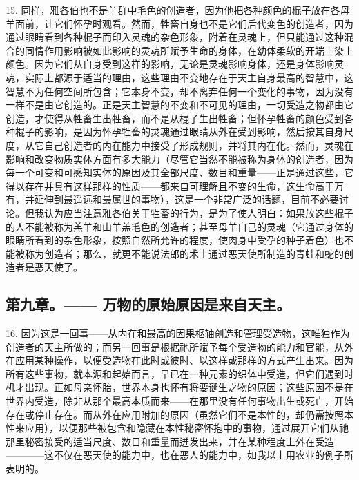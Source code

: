 15. 同样，雅各伯也不是羊群中毛色的创造者，因为他把各种颜色的棍子放在各母羊面前，让它们怀孕时观看。然而，牲畜自身也不是它们后代变色的创造者，因为通过眼睛看到各种棍子而印入灵魂的杂色形象，附着在灵魂上，但只能通过这种混合的同情作用影响被如此影响的灵魂所赋予生命的身体，在幼体柔软的开端上染上颜色。因为它们从自身受到这样的影响，无论是灵魂影响身体，还是身体影响灵魂，实际上都源于适当的理由，这些理由不变地存在于天主自身最高的智慧中，这智慧不为任何空间所包含；它本身不变，却不离弃任何一个变化的事物，因为没有一样不是由它创造的。正是天主智慧的不变和不可见的理由，一切受造之物都由它创造，才使得从牲畜生出牲畜，而不是从棍子生出牲畜；但怀孕牲畜的颜色受到各种棍子的影响，是因为怀孕牲畜的灵魂通过眼睛从外在受到影响，然后按其自身尺度，从它自己创造者的内在能力中接受了形成规则，并将其内在化。然而，灵魂在影响和改变物质实体方面有多大能力（尽管它当然不能被称为身体的创造者，因为每一个可变和可感知实体的原因及其全部尺度、数目和重量——正是通过这些，它得以存在并具有这样那样的性质——都来自可理解且不变的生命，这生命高于万有，并延伸到最遥远和最属世的事物），这是一个非常广泛的话题，目前不必要讨论。但我认为应当注意雅各伯关于牲畜的行为，是为了使人明白：如果放这些棍子的人不能被称为羔羊和山羊羔毛色的创造者；甚至母羊自己的灵魂（它通过身体的眼睛所看到的杂色形象，按照自然所允许的程度，使肉身中受孕的种子着色）也不能被称为创造者；那么，就更不能说法郎的术士通过恶天使所制造的青蛙和蛇的创造者是恶天使了。\par


\subsection{第九章。—— 万物的原始原因是来自天主。}

16. 因为这是一回事——从内在和最高的因果枢轴创造和管理受造物，这唯独作为创造者的天主所做的；而另一回事是根据祂所赋予每个受造物的能力和官能，从外在应用某种操作，以便受造物在此时或彼时、以这样或那样的方式产生出来。因为所有这些事物，就本源和起始而言，早已在一种元素的织体中受造，但它们遇到时机才出现。正如母亲怀胎，世界本身也怀有将要诞生之物的原因；这些原因不是在世界内受造，除非从那个最高本质而来——在那里没有任何事物出生或死亡，开始存在或停止存在。而从外在应用附加的原因（虽然它们不是本性的，却仍需按照本性来应用），以便那些被包含和隐藏在本性秘密怀抱中的事物，通过展开它们从祂那里秘密接受的适当尺度、数目和重量而迸发出来，并在某种程度上外在受造————这不仅在恶天使的能力中，也在恶人的能力中，如我以上用农业的例子所表明的。\par

